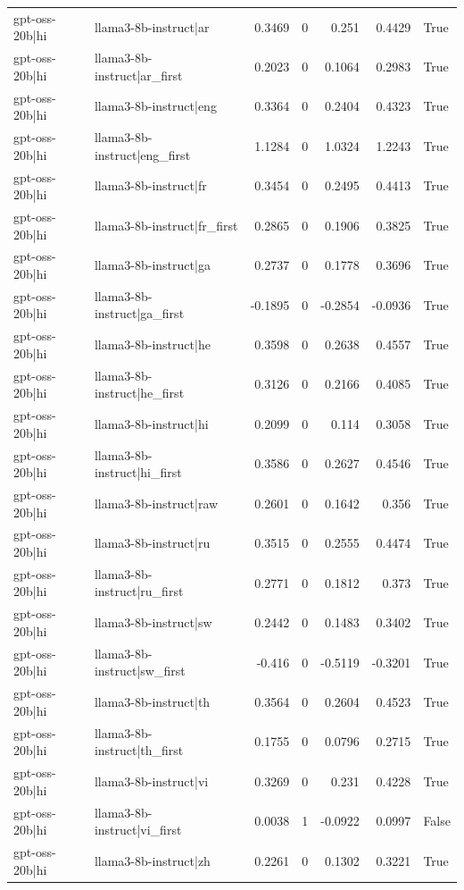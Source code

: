 \begin{table}
\begin{tabular}{l l r r r r l}
gpt-oss-20b|hi & llama3-8b-instruct|ar & 0.3469 & 0 & 0.251 & 0.4429 & True \\
gpt-oss-20b|hi & llama3-8b-instruct|ar_first & 0.2023 & 0 & 0.1064 & 0.2983 & True \\
gpt-oss-20b|hi & llama3-8b-instruct|eng & 0.3364 & 0 & 0.2404 & 0.4323 & True \\
gpt-oss-20b|hi & llama3-8b-instruct|eng_first & 1.1284 & 0 & 1.0324 & 1.2243 & True \\
gpt-oss-20b|hi & llama3-8b-instruct|fr & 0.3454 & 0 & 0.2495 & 0.4413 & True \\
gpt-oss-20b|hi & llama3-8b-instruct|fr_first & 0.2865 & 0 & 0.1906 & 0.3825 & True \\
gpt-oss-20b|hi & llama3-8b-instruct|ga & 0.2737 & 0 & 0.1778 & 0.3696 & True \\
gpt-oss-20b|hi & llama3-8b-instruct|ga_first & -0.1895 & 0 & -0.2854 & -0.0936 & True \\
gpt-oss-20b|hi & llama3-8b-instruct|he & 0.3598 & 0 & 0.2638 & 0.4557 & True \\
gpt-oss-20b|hi & llama3-8b-instruct|he_first & 0.3126 & 0 & 0.2166 & 0.4085 & True \\
gpt-oss-20b|hi & llama3-8b-instruct|hi & 0.2099 & 0 & 0.114 & 0.3058 & True \\
gpt-oss-20b|hi & llama3-8b-instruct|hi_first & 0.3586 & 0 & 0.2627 & 0.4546 & True \\
gpt-oss-20b|hi & llama3-8b-instruct|raw & 0.2601 & 0 & 0.1642 & 0.356 & True \\
gpt-oss-20b|hi & llama3-8b-instruct|ru & 0.3515 & 0 & 0.2555 & 0.4474 & True \\
gpt-oss-20b|hi & llama3-8b-instruct|ru_first & 0.2771 & 0 & 0.1812 & 0.373 & True \\
gpt-oss-20b|hi & llama3-8b-instruct|sw & 0.2442 & 0 & 0.1483 & 0.3402 & True \\
gpt-oss-20b|hi & llama3-8b-instruct|sw_first & -0.416 & 0 & -0.5119 & -0.3201 & True \\
gpt-oss-20b|hi & llama3-8b-instruct|th & 0.3564 & 0 & 0.2604 & 0.4523 & True \\
gpt-oss-20b|hi & llama3-8b-instruct|th_first & 0.1755 & 0 & 0.0796 & 0.2715 & True \\
gpt-oss-20b|hi & llama3-8b-instruct|vi & 0.3269 & 0 & 0.231 & 0.4228 & True \\
gpt-oss-20b|hi & llama3-8b-instruct|vi_first & 0.0038 & 1 & -0.0922 & 0.0997 & False \\
gpt-oss-20b|hi & llama3-8b-instruct|zh & 0.2261 & 0 & 0.1302 & 0.3221 & True \\

\end{tabular}
\end{table}
